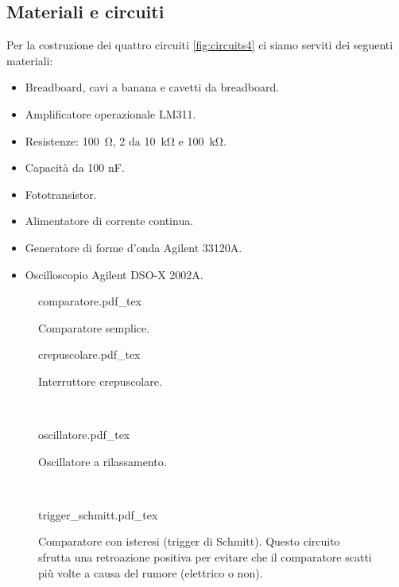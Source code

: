 \subsection{Materiali e circuiti}

Per la costruzione dei quattro circuiti \ref{fig:circuits4} ci
siamo serviti dei seguenti materiali:

\begin{itemize}
    \item{Breadboard, cavi a banana e cavetti da breadboard.}
    \item{Amplificatore operazionale LM311.}
    \item{Resistenze: \SI{100}{\ohm}, 2 da \SI{10}{\kilo\ohm} e \SI{100}{\kilo\ohm}.}
    \item{Capacità da 100 nF.}
    \item{Fototransistor.}
    \item{Alimentatore di corrente continua.}
    \item{Generatore di forme d'onda Agilent 33120A.}
    \item{Oscilloscopio Agilent DSO-X 2002A.}
\end{itemize}

\begin{figure*}[b!]
        \centering
        \begin{subfigure}[b]{0.33\textwidth}
            \def\svgwidth{\columnwidth}
            {comparatore.pdf_tex}
            \caption{Comparatore semplice.}
            \label{fig:comparatore4}
        \end{subfigure}
        \quad
        \begin{subfigure}[b]{0.63\textwidth}
            \def\svgwidth{\columnwidth}
            {crepuscolare.pdf_tex}
            \caption{Interruttore crepuscolare.}
            \label{fig:crepuscolare4}
        \end{subfigure}
        ~
        \begin{subfigure}[b]{0.48\textwidth}
            \def\svgwidth{\columnwidth}
            {oscillatore.pdf_tex}
            \caption{Oscillatore a rilassamento.}
            \label{fig:oscillatore4}
        \end{subfigure}
        ~
        \begin{subfigure}[b]{0.44\textwidth}
            \def\svgwidth{\columnwidth}
            {trigger_schmitt.pdf_tex}
            \caption{Comparatore con isteresi (trigger di Schmitt). Questo circuito
                sfrutta una retroazione positiva per evitare che il comparatore
                scatti più volte a causa del rumore (elettrico o non).}
            \label{fig:trigger_schmitt4}
        \end{subfigure}

        \caption{Circuiti costruiti durante l'esperienza}
        \label{fig:circuits4}
\end{figure*}
